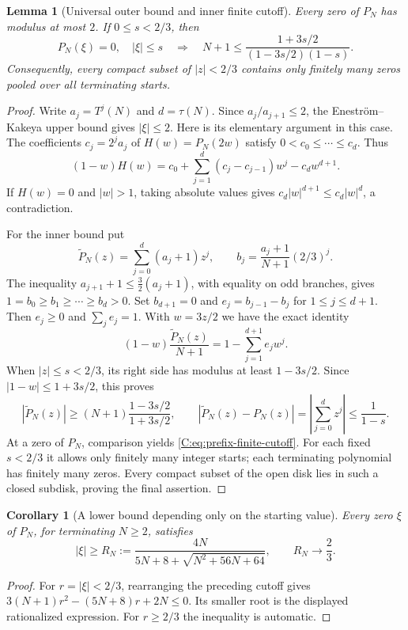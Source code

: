\documentclass[11pt,a4paper]{article}
\newtheorem{lemma}[theorem]{Lemma}
\newtheorem{corollary}[theorem]{Corollary}
\theoremstyle{definition}
\theoremstyle{remark}
\numberwithin{equation}{section}
\begin{document}
\begin{lemma}[Universal outer bound and inner finite cutoff]
\label{C:lem:prefix-zero-bounds}
Every zero of $P_N$ has modulus at most $2$. If $0\le s<2/3$, then
\begin{equation}\label{C:eq:prefix-finite-cutoff}
 P_N(\xi)=0,\quad |\xi|\le s
 \quad\Longrightarrow\quad
 N+1\le\frac{1+3s/2}{(1-3s/2)(1-s)}.
\end{equation}
Consequently, every compact subset of $|z|<2/3$ contains only finitely
many zeros pooled over all terminating starts.
\end{lemma}
\begin{proof}
Write $a_j=T^j(N)$ and $d=\tau(N)$. Since $a_j/a_{j+1}\le2$, the
Enestr\"om--Kakeya upper bound gives $|\xi|\le2$. Here is its elementary
argument in this case. The coefficients $c_j=2^j a_j$ of
$H(w)=P_N(2w)$ satisfy $0<c_0\le\cdots\le c_d$. Thus
\[
 (1-w)H(w)=c_0+\sum_{j=1}^d(c_j-c_{j-1})w^j-c_dw^{d+1}.
\]
If $H(w)=0$ and $|w|>1$, taking absolute values gives
$c_d|w|^{d+1}\le c_d|w|^d$, a contradiction.

For the inner bound put
\[
 \widetilde P_N(z)=\sum_{j=0}^d(a_j+1)z^j,
 \qquad b_j=\frac{a_j+1}{N+1}(2/3)^j.
\]
The inequality $a_{j+1}+1\le\tfrac32(a_j+1)$, with equality on odd
branches, gives $1=b_0\ge b_1\ge\cdots\ge b_d>0$. Set $b_{d+1}=0$
and $e_j=b_{j-1}-b_j$ for $1\le j\le d+1$. Then $e_j\ge0$ and
$\sum_j e_j=1$. With $w=3z/2$ we have the exact identity
\[
 (1-w)\frac{\widetilde P_N(z)}{N+1}
 =1-\sum_{j=1}^{d+1}e_jw^j.
\]
When $|z|\le s<2/3$, its right side has modulus at least $1-3s/2$.
Since $|1-w|\le1+3s/2$, this proves
\[
 |\widetilde P_N(z)|\ge(N+1)\frac{1-3s/2}{1+3s/2},
 \qquad
 |\widetilde P_N(z)-P_N(z)|
 =\left|\sum_{j=0}^d z^j\right|\le\frac1{1-s}.
\]
At a zero of $P_N$, comparison yields
\eqref{C:eq:prefix-finite-cutoff}. For each fixed $s<2/3$ it allows only
finitely many integer starts; each terminating polynomial has finitely
many zeros. Every compact subset of the open disk lies in such a closed
subdisk, proving the final assertion.
\end{proof}


\begin{corollary}[A lower bound depending only on the starting value]
Every zero $\xi$ of $P_N$, for terminating $N\ge2$, satisfies
\begin{equation}\label{C:eq:ucz-N-bound}
 |\xi|\ge R_N:=
 \frac{4N}{5N+8+\sqrt{N^2+56N+64}},\qquad R_N\longrightarrow\frac23.
\end{equation}
\end{corollary}
\begin{proof}
For $r=|\xi|<2/3$, rearranging the preceding cutoff gives
$3(N+1)r^2-(5N+8)r+2N\le0$. Its smaller root is the displayed
rationalized expression. For $r\ge2/3$ the inequality is automatic.
\end{proof}
\end{document}
